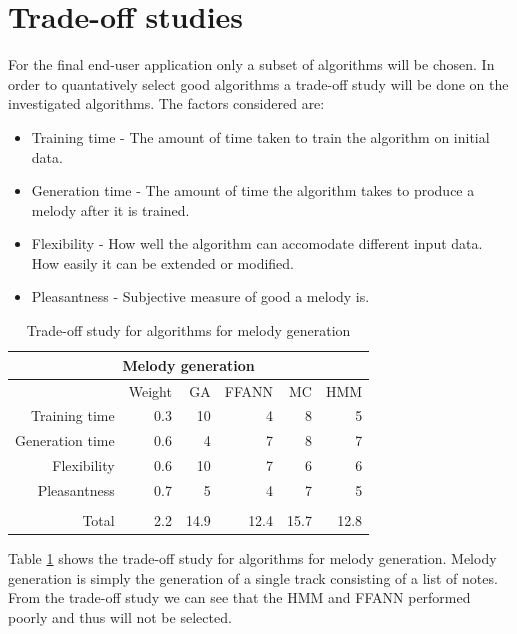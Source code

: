 \section{Trade-off studies}
For the final end-user application only a subset of algorithms will be chosen. In order to quantatively select good algorithms a trade-off study will be done on the investigated algorithms. The factors considered are:
\begin{itemize}
\item Training time - The amount of time taken to train the algorithm on initial data.
\item Generation time - The amount of time the algorithm takes to produce a melody after it is trained.
\item Flexibility - How well the algorithm can accomodate different input data. How easily it can be extended or modified.
\item Pleasantness - Subjective measure of good a melody is.
\end{itemize}
\begin{table}[htbp]
  \centering
  \caption{Trade-off study for algorithms for melody generation}
    \begin{tabular}{rr|rrrr}
    \toprule
    \multicolumn{6}{c}{Melody generation} \\
    \midrule
          & Weight & GA    & FFANN & MC    & HMM \\
    \midrule 
    Training time & 0.3   & 10    & 4     & 8     & 5 \\
    Generation time & 0.6   & 4     & 7     & 8     & 7 \\
    Flexibility & 0.6   & 10    & 7     & 6     & 6 \\
    Pleasantness & 0.7   & 5     & 4     & 7     & 5 \\
          &       &       &       &       &  \\
          \bottomrule
    Total & 2.2   & 14.9  & 12.4  & 15.7  & 12.8 \\
    \bottomrule
    \end{tabular}%
  \label{tab:tomelgen}%
\end{table}%

Table \ref{tab:tomelgen} shows the trade-off study for algorithms for melody generation. Melody generation is simply the generation of a single track consisting of a list of notes. From the trade-off study we can see that the \ac{HMM} and \ac{FFANN} performed poorly and thus will not be selected.

